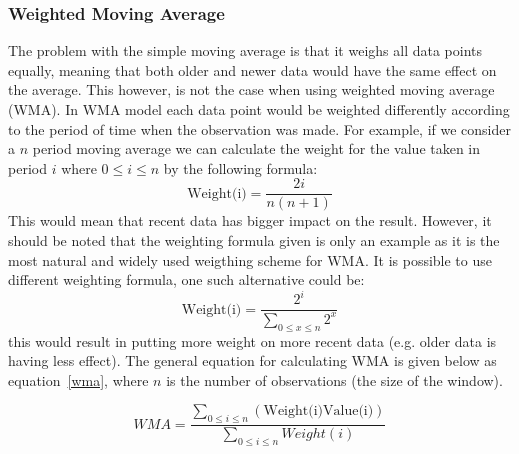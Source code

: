 \begin{figure}[ht]
	\caption{}
	\label{fig:cmaGraph}
\end{figure}

\FloatBarrier
\subsubsection{Weighted Moving Average}
The problem with the simple moving average is that it weighs all data points equally, meaning that both older and newer data would have the same effect on the average. This however, is not the case when using weighted moving average (WMA). In WMA model each data point would be weighted differently according to the period of time when the observation was made. For example, if we consider a $n$ period moving average we can calculate the weight for the value taken in period $i$ where $0\le i\le n$ by the following formula: \[\textrm{Weight(i)} = \frac{2i}{n(n+1)}\] This would mean that recent data has bigger impact on the result. However, it should be noted that the weighting formula given is only an example as it is the most natural and widely used weigthing scheme for WMA. It is possible to use different weighting formula, one such alternative could be: \[\textrm{Weight(i)} = \frac{2^i}{\sum_{0\le x\le n}2^x}\] this would result in putting more weight on more recent data (e.g. older data is having less effect). The general equation for calculating WMA is given below as equation~\ref{wma}, where $n$ is the number of observations (the size of the window).

\begin{equation}\label{wma}
WMA = \frac{\sum_{0\le i\le n}(\textrm{Weight(i)}\textrm{Value(i)})}{\sum_{0\le i\le n}Weight(i)}
\end{equation}

